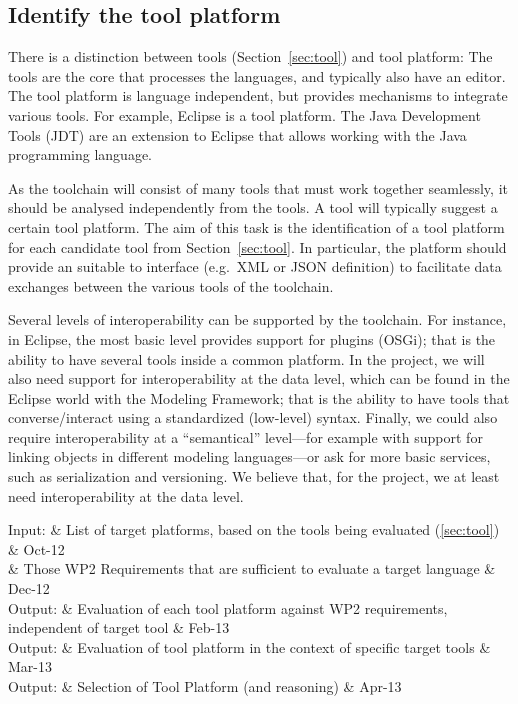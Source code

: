 \documentclass{template/openetcs_article}
\begin{document}
\subsection{Identify the tool platform}
\label{sec:tool_platform}

There is a distinction between tools (Section~\ref{sec:tool}) and tool
platform: The tools are the core that processes the languages, and
typically also have an editor. The tool platform is language
independent, but provides mechanisms to integrate various tools. For
example, Eclipse is a tool platform. The Java Development Tools (JDT)
are an extension to Eclipse that allows working with the Java
programming language.

As the toolchain will consist of many tools that must work together
seamlessly, it should be analysed independently from the tools. A tool
will typically suggest a certain tool platform. The aim of this task
is the identification of a tool platform for each candidate tool from
Section~\ref{sec:tool}. In particular, the platform should provide an
suitable to interface (e.g.~XML or JSON definition) to facilitate data
exchanges between the various tools of the toolchain.

Several levels of interoperability can be supported by the
toolchain. For instance, in Eclipse, the most basic level
provides support for plugins (OSGi); that is the ability to have
several tools inside a common platform. In the project, we will also
need support for interoperability at the data level, which can be
found in the Eclipse world with the Modeling Framework; that is the
ability to have tools that converse/interact using a standardized
(low-level) syntax. Finally, we could also require interoperability at
a ``semantical'' level---for example with support for linking objects
in different modeling languages---or ask for more basic services, such
as serialization and versioning. We believe that, for the project, we
at least need interoperability at the data level.

\begin{inoutput}
Input: & List of target platforms, based on the tools being evaluated (\ref{sec:tool}) & Oct-12 \\
& Those WP2 Requirements that are sufficient to evaluate a target language & Dec-12 \\
\hline
Output: & Evaluation of each tool platform against WP2 requirements, independent of target tool & Feb-13 \\
Output: & Evaluation of tool platform in the context of specific target tools & Mar-13 \\
Output: & Selection of Tool Platform (and reasoning) & Apr-13 \\
\end{inoutput}
\end{document}
